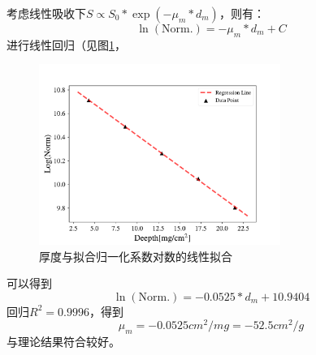 \documentclass{article}
\begin{document}
    考虑线性吸收下$S\propto S_0*\exp(-\mu_m*d_m)$，则有：
    \begin{equation}
        \ln{(\text{Norm.})} = -\mu_m*d_m+C
    \end{equation}
    进行线性回归（见图\ref{fig:LinearReg2}，
    \begin{figure}[htbp]
        \centering
        \includegraphics[width=0.7\textwidth]{../plot/LinearReg2.pdf}
        \caption{厚度与拟合归一化系数对数的线性拟合\label{fig:LinearReg2}}
    \end{figure}
    可以得到
    \begin{equation}
        \ln{(\text{Norm.})} = -0.0525*d_m+10.9404 
    \end{equation}
    回归$R^2 = 0.9996$，得到
    \begin{equation}
        \mu_m = -0.0525\si{cm^2\per mg} = -52.5\si{cm^2\per g}
    \end{equation}
    与理论结果符合较好。
\end{document}
